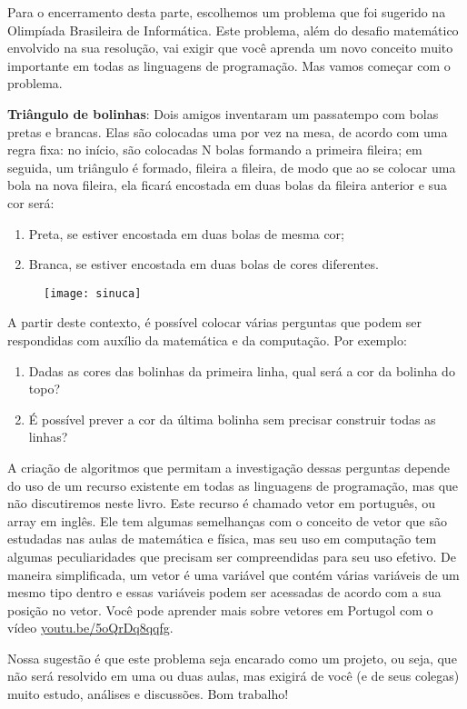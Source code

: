 \newpage

\begin{project}
\label{comp-know3}

Para o encerramento desta parte, escolhemos um problema que foi sugerido na Olimpíada Brasileira de Informática. Este problema, além do desafio matemático envolvido na sua resolução, vai exigir que você aprenda um novo conceito muito importante em todas as linguagens de programação. Mas vamos começar com o problema.

\textbf{Triângulo de bolinhas}: Dois amigos inventaram um passatempo com bolas pretas e brancas. Elas são colocadas uma por vez na mesa, de acordo com uma regra fixa: no início, são colocadas N bolas formando a primeira fileira; em seguida, um triângulo é formado, fileira a fileira, de modo que ao se colocar uma bola na nova fileira, ela ficará encostada em duas bolas da fileira anterior e sua cor será:

\begin{enumerate}
\item Preta, se estiver encostada em duas bolas de mesma cor;
\item Branca, se estiver encostada em duas bolas de cores diferentes.
\end{enumerate}

\begin{figure}[H]
\centering

\texttt{[image: sinuca]}
\end{figure}

A partir deste contexto, é possível colocar várias perguntas que podem ser respondidas com auxílio da matemática e da computação. Por exemplo:

\begin{enumerate}
\item Dadas as cores das bolinhas da primeira linha, qual será a cor da bolinha do topo?
\item É possível prever a cor da última bolinha sem precisar construir todas as linhas?
\end{enumerate}

A criação de algoritmos que permitam a investigação dessas perguntas depende do uso de um recurso existente em todas as linguagens de programação, mas que não discutiremos neste livro. Este recurso é chamado vetor em português, ou array em inglês. Ele tem algumas semelhanças com o conceito de vetor que são estudadas nas aulas de matemática e física, mas seu uso em computação tem algumas peculiaridades que precisam ser compreendidas para seu uso efetivo. De maneira simplificada, um vetor é uma variável que contém várias variáveis de um mesmo tipo dentro e essas variáveis podem ser acessadas de acordo com a sua posição no vetor. Você pode aprender mais sobre vetores em Portugol com o vídeo \url{youtu.be/5oQrDq8qqfg}.

Nossa sugestão é que este problema seja encarado como um projeto, ou seja, que não será resolvido em uma ou duas aulas, mas exigirá de você (e de seus colegas) muito estudo, análises e discussões. Bom trabalho!
% 
\end{project}



